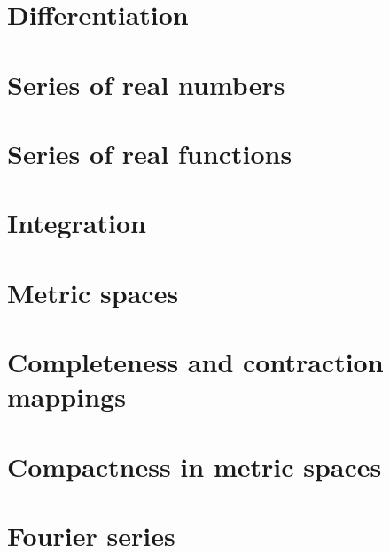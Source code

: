 \section{Differentiation}

\section{Series of real numbers}

\section{Series of real functions}

\section{Integration}

\section{Metric spaces}

\section{Completeness and contraction mappings}

\section{Compactness in metric spaces}

\section{Fourier series}

